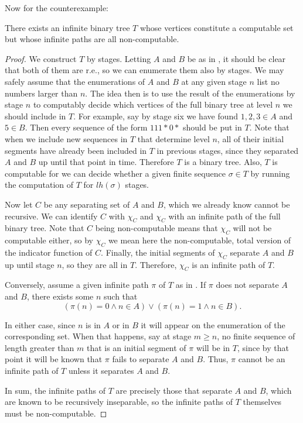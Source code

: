 \documentclass[../main.tex]{memoir}
\begin{document}
Now for the counterexample:

\begin{theorem}
  \label{thm:wkl-counterexample}
  There exists an infinite binary tree $T$ whose vertices constitute a computable set but whose infinite paths are all non-computable.
\end{theorem}
\begin{proof}
  We construct $T$ by stages. Letting $A$ and $B$ be as in , it should be clear that both of them are r.e., so we can enumerate them also by stages. We may safely assume that the enumerations of $A$ and $B$ at any given stage $n$ list no numbers larger than $n$. The idea then is to use the result of the enumerations by stage $n$ to computably decide which vertices of the full binary tree at level $n$ we should include in $T$. For example, say by stage six we have found $1, 2, 3 \in A$ and $5 \in B$. Then every sequence of the form $111*0*$ should be put in $T$. Note that when we include new sequences in $T$ that determine level $n$, all of their initial segments have already been included in $T$ in previous stages, since they separated $A$ and $B$ up until that point in time. Therefore $T$ is a binary tree. Also, $T$ is computable for we can decide whether a given finite sequence $\sigma \in T$ by running the computation of $T$ for $lh(\sigma)$ stages.

  Now let $C$ be any separating set of $A$ and $B$, which we already know cannot be recursive. We can identify $C$ with $\chi_C$ and $\chi_C$ with an infinite path of the full binary tree. Note that $C$ being non-computable means that $\chi_C$ will not be computable either, so by $\chi_C$ we mean here the non-computable, total version of the indicator function of $C$. Finally, the initial segments of $\chi_C$ separate $A$ and $B$ up until stage $n$, so they are all in $T$. Therefore, $\chi_C$ is an infinite path of $T$.

  Conversely, assume a given infinite path $\pi$ of $T$ as in . If $\pi$ does not separate $A$ and $B$, there exists some $n$ such that
  \[ (\pi(n) = 0 \land n \in A) \lor (\pi(n) = 1 \land n \in B). \]

  In either case, since $n$ is in $A$ or in $B$ it will appear on the enumeration of the corresponding set. When that happens, say at stage $m \ge n$, no finite sequence of length greater than $m$ that is an initial segment of $\pi$ will be in $T$, since by that point it will be known that $\pi$ fails to separate $A$ and $B$. Thus, $\pi$ cannot be an infinite path of $T$ unless it separates $A$ and $B$.

  In sum, the infinite paths of $T$ are precisely those that separate $A$ and $B$, which are known to be recursively inseparable, so the infinite paths of $T$ themselves must be non-computable.
\end{proof}
\end{document}
